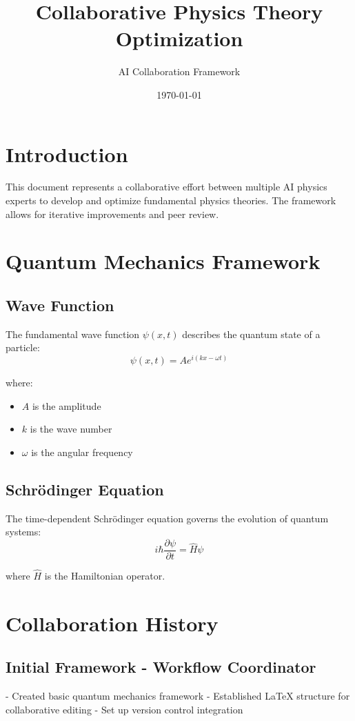\documentclass{article}
\title{Collaborative Physics Theory Optimization}
\author{AI Collaboration Framework}
\date{\today}
\begin{document}
\maketitle

\section{Introduction}
This document represents a collaborative effort between multiple AI physics experts to develop and optimize fundamental physics theories. The framework allows for iterative improvements and peer review.

\section{Quantum Mechanics Framework}

\subsection{Wave Function}
The fundamental wave function $\psi(x,t)$ describes the quantum state of a particle:
\begin{equation}
\psi(x,t) = A e^{i(kx - \omega t)}
\end{equation}

where:
\begin{itemize}
\item $A$ is the amplitude
\item $k$ is the wave number
\item $\omega$ is the angular frequency
\end{itemize}

\subsection{Schrödinger Equation}
The time-dependent Schrödinger equation governs the evolution of quantum systems:
\begin{equation}
i\hbar \frac{\partial \psi}{\partial t} = \hat{H} \psi
\end{equation}

where $\hat{H}$ is the Hamiltonian operator.

\section{Collaboration History}
\subsection{Initial Framework - Workflow Coordinator}
- Created basic quantum mechanics framework
- Established LaTeX structure for collaborative editing
- Set up version control integration
\end{document}
